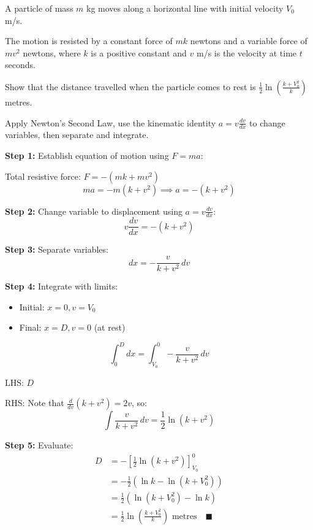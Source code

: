 \vspace{1.5cm}


\begin{problem}
A particle of mass $m$ kg moves along a horizontal line with initial velocity $V_0$ m/s.

The motion is resisted by a constant force of $mk$ newtons and a variable force of $mv^2$ newtons, where $k$ is a positive constant and $v$ m/s is the velocity at time $t$ seconds.

Show that the distance travelled when the particle comes to rest is $\displaystyle \frac{1}{2}\ln\left(\frac{k + V_0^2}{k}\right)$ metres.
\end{problem}

\begin{hint}
Apply Newton's Second Law, use the kinematic identity $a = v\frac{dv}{dx}$ to change variables, then separate and integrate.
\end{hint}

\begin{solution}
\textbf{Step 1:} Establish equation of motion using $F = ma$:

Total resistive force: $F = -(mk + mv^2)$
\[
ma = -m(k + v^2) \implies a = -(k + v^2)
\]

\textbf{Step 2:} Change variable to displacement using $a = v\frac{dv}{dx}$:
\[
v \frac{dv}{dx} = -(k + v^2)
\]

\textbf{Step 3:} Separate variables:
\[
dx = -\frac{v}{k + v^2} \, dv
\]

\textbf{Step 4:} Integrate with limits:
\begin{itemize}
\item Initial: $x=0, v=V_0$
\item Final: $x=D, v=0$ (at rest)
\end{itemize}

\[
\int_{0}^{D} dx = \int_{V_0}^{0} -\frac{v}{k + v^2} \, dv
\]

LHS: $D$

RHS: Note that $\frac{d}{dv}(k+v^2) = 2v$, so:
\[
\int \frac{v}{k+v^2} \, dv = \frac{1}{2} \ln(k+v^2)
\]

\textbf{Step 5:} Evaluate:
\begin{align*}
D &= -\left[ \frac{1}{2} \ln(k + v^2) \right]_{V_0}^{0} \\
&= -\frac{1}{2}(\ln k - \ln(k + V_0^2)) \\
&= \frac{1}{2}(\ln(k + V_0^2) - \ln k) \\
&= \boxed{\frac{1}{2}\ln\left(\frac{k + V_0^2}{k}\right) \text{ metres}} \quad \blacksquare
\end{align*}
\end{solution}

